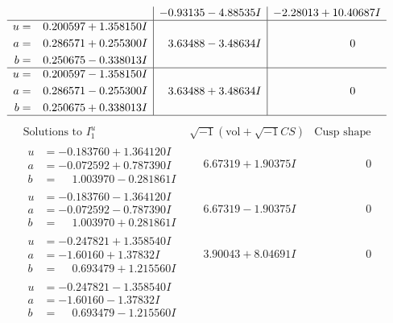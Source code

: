\documentclass[1p]{elsarticle_modified}
\theoremstyle{definition}
\newcommand{\I}{\sqrt{-1}}
\begin{document}
$$\begin{array}{c|c|c}
 & -0.93135 - 4.88535 I & -2.28013 + 10.40687 I \\ \hline\begin{aligned}
u &= \phantom{-}0.200597 + 1.358150 I \\
a &= \phantom{-}0.286571 + 0.255300 I \\
b &= \phantom{-}0.250675 - 0.338013 I\end{aligned}
 & \phantom{-}3.63488 - 3.48634 I & \phantom{-0.000000 } 0 \\ \hline\begin{aligned}
u &= \phantom{-}0.200597 - 1.358150 I \\
a &= \phantom{-}0.286571 - 0.255300 I \\
b &= \phantom{-}0.250675 + 0.338013 I\end{aligned}
 & \phantom{-}3.63488 + 3.48634 I & \phantom{-0.000000 } 0\\
 \hline 
 \end{array}$$\newpage$$\begin{array}{c|c|c}  
\text{Solutions to }I^u_{1}& \I (\text{vol} + \sqrt{-1}CS) & \text{Cusp shape}\\
 \hline 
\begin{aligned}
u &= -0.183760 + 1.364120 I \\
a &= -0.072592 + 0.787390 I \\
b &= \phantom{-}1.003970 - 0.281861 I\end{aligned}
 & \phantom{-}6.67319 + 1.90375 I & \phantom{-0.000000 } 0 \\ \hline\begin{aligned}
u &= -0.183760 - 1.364120 I \\
a &= -0.072592 - 0.787390 I \\
b &= \phantom{-}1.003970 + 0.281861 I\end{aligned}
 & \phantom{-}6.67319 - 1.90375 I & \phantom{-0.000000 } 0 \\ \hline\begin{aligned}
u &= -0.247821 + 1.358540 I \\
a &= -1.60160 + 1.37832 I \\
b &= \phantom{-}0.693479 + 1.215560 I\end{aligned}
 & \phantom{-}3.90043 + 8.04691 I & \phantom{-0.000000 } 0 \\ \hline\begin{aligned}
u &= -0.247821 - 1.358540 I \\
a &= -1.60160 - 1.37832 I \\
b &= \phantom{-}0.693479 - 1.215560 I\end{aligned}

\end{array}$$
\end{document}
